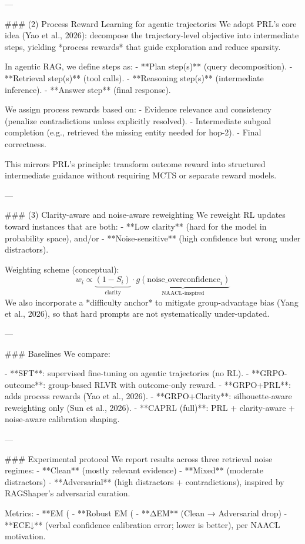 ---

### (2) Process Reward Learning for agentic trajectories  
We adopt PRL’s core idea (Yao et al., 2026): decompose the trajectory-level objective into intermediate steps, yielding *process rewards* that guide exploration and reduce sparsity.

In agentic RAG, we define steps as:
- **Plan step(s)** (query decomposition).
- **Retrieval step(s)** (tool calls).
- **Reasoning step(s)** (intermediate inference).
- **Answer step** (final response).

We assign process rewards based on:
- Evidence relevance and consistency (penalize contradictions unless explicitly resolved).
- Intermediate subgoal completion (e.g., retrieved the missing entity needed for hop-2).
- Final correctness.

This mirrors PRL’s principle: transform outcome reward into structured intermediate guidance without requiring MCTS or separate reward models.

---

### (3) Clarity-aware and noise-aware reweighting  
We reweight RL updates toward instances that are both:
- **Low clarity** (hard for the model in probability space), and/or
- **Noise-sensitive** (high confidence but wrong under distractors).

Weighting scheme (conceptual):
\[
w_i \propto \underbrace{(1 - S_i)}_{\text{clarity}} \cdot \underbrace{g(\text{noise\_overconfidence}_i)}_{\text{NAACL-inspired}}
\]
We also incorporate a *difficulty anchor* to mitigate group-advantage bias (Yang et al., 2026), so that hard prompts are not systematically under-updated.

---

### Baselines  
We compare:

- **SFT**: supervised fine-tuning on agentic trajectories (no RL).  
- **GRPO-outcome**: group-based RLVR with outcome-only reward.  
- **GRPO+PRL**: adds process rewards (Yao et al., 2026).  
- **GRPO+Clarity**: silhouette-aware reweighting only (Sun et al., 2026).  
- **CAPRL (full)**: PRL + clarity-aware + noise-aware calibration shaping.

---

### Experimental protocol  
We report results across three retrieval noise regimes:
- **Clean** (mostly relevant evidence)
- **Mixed** (moderate distractors)
- **Adversarial** (high distractors + contradictions), inspired by RAGShaper’s adversarial curation.

Metrics:
- **EM (%
- **Robust EM (%
- **ΔEM** (Clean → Adversarial drop)
- **ECE↓** (verbal confidence calibration error; lower is better), per NAACL motivation.

